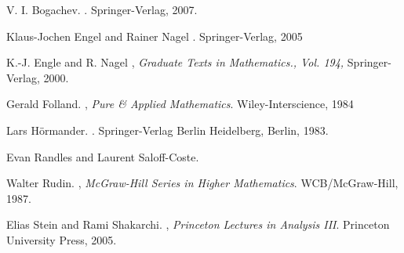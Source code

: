 \documentclass[11pt]{article}
\theoremstyle{theorem}
\begin{document}
\begin{thebibliography}{99}

V. I. Bogachev.
.
\newblock Springer-Verlag, 2007.

Klaus-Jochen Engel and Rainer Nagel
.
\newblock Springer-Verlag, 2005

K.-J. Engle and R. Nagel
, {\em Graduate Texts in Mathematics., Vol. 194,}
\newblock Springer-Verlag, 2000. 

Gerald Folland.
, {\em Pure \& Applied Mathematics}.
\newblock Wiley-Interscience, 1984

Lars H{\"{o}}rmander.
.
\newblock Springer-Verlag Berlin Heidelberg, Berlin, 1983.

Evan Randles and Laurent Saloff-Coste. 


Walter Rudin.
, {\em McGraw-Hill Series in Higher Mathematics}.
\newblock WCB/McGraw-Hill, 1987.

Elias Stein and Rami Shakarchi.
, {\em Princeton Lectures in Analysis III}.
\newblock Princeton University Press, 2005.

\end{thebibliography}
\end{document}
